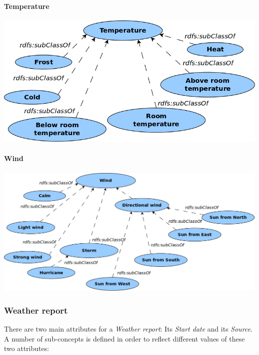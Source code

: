 \paragraph{Temperature}

\begin{center}
  \includegraphics[width=.8\textwidth]{figures/diagrams/temperature.png}
\end{center}

\paragraph{Wind}

\begin{center}
  \includegraphics[width=\textwidth]{figures/diagrams/wind.png}
\end{center}

\subsubsection{Weather report}

There are two main attributes for a \emph{Weather report}: Its \emph{Start date} and its \emph{Source}. A number of sub-concepts is defined in order to reflect different values of these two attributes:


